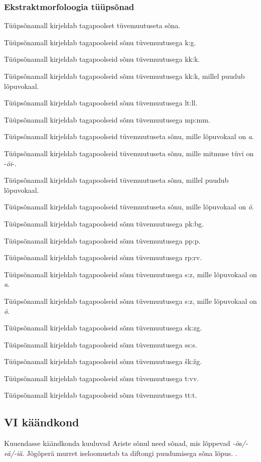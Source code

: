 \documentclass[12pt,a4paper]{article}
\newcommand{\vadja}[1]{\textit{#1}}
\begin{document}
\subsubsection*{Ekstraktmorfoloogia tüüpsõnad}
\vspace{-3.5em}

Tüüpsõna\-mall kirjeldab tagapoolset tüvemuutuseta sõna.

Tüüpsõna\-mall kirjeldab tagapoolseid sõnu tüvemuutusega k:g.

Tüüpsõna\-mall kirjeldab tagapoolseid sõnu tüvemuutusega kk:k.

Tüüpsõna\-mall kirjeldab tagapoolseid sõnu tüvemuutusega kk:k, millel puudub lõpuvokaal.

Tüüpsõna\-mall kirjeldab tagapoolseid sõnu tüvemuutusega lt:ll.

Tüüpsõna\-mall kirjeldab tagapoolseid sõnu tüvemuutusega mp:mm.

Tüüpsõna\-mall kirjeldab tagapoolseid tüvemuutuseta sõnu, mille lõpuvokaal on \textit{a}.

Tüüpsõna\-mall kirjeldab tagapoolseid tüvemuutuseta sõnu, mille mitmuse tüvi on -\textit{õi}-.

Tüüpsõna\-mall kirjeldab tagapoolseid tüvemuutuseta sõnu, millel puudub lõpuvokaal.

Tüüpsõna\-mall kirjeldab tagapoolseid tüvemuutuseta sõnu, mille lõpuvokaal on \textit{õ}.

Tüüpsõna\-mall kirjeldab tagapoolseid sõnu tüvemuutusega pk:bg.

Tüüpsõna\-mall kirjeldab tagapoolseid sõnu tüvemuutusega pp:p.

Tüüpsõna\-mall kirjeldab tagapoolseid sõnu tüvemuutusega rp:rv.

Tüüpsõna\-mall kirjeldab tagapoolseid sõnu tüvemuutusega s:z, mille lõpuvokaal on \textit{a}.

Tüüpsõna\-mall kirjeldab tagapoolseid sõnu tüvemuutusega s:z, mille lõpuvokaal on \textit{õ}.

Tüüpsõna\-mall kirjeldab tagapoolseid sõnu tüvemuutusega sk:zg.

Tüüpsõna\-mall kirjeldab tagapoolseid sõnu tüvemuutusega ss:s.

Tüüpsõna\-mall kirjeldab tagapoolseid sõnu tüvemuutusega šk:žg.

Tüüpsõna\-mall kirjeldab tagapoolseid sõnu tüvemuutusega t:vv.

Tüüpsõna\-mall kirjeldab tagapoolseid sõnu tüvemuutusega tt:t.
  
\subsection{\RN{6} käändkond}

Kuuendasse käändkonda kuuluvad Ariste sõnul need sõnad, mis lõppevad \vadja{-õa/-eä/-iä}. Jõgõperä murret iseloomustab ta diftongi puudumisega sõna lõpus. \cite[44]{ariste_grammar_1968}.
\end{document}
